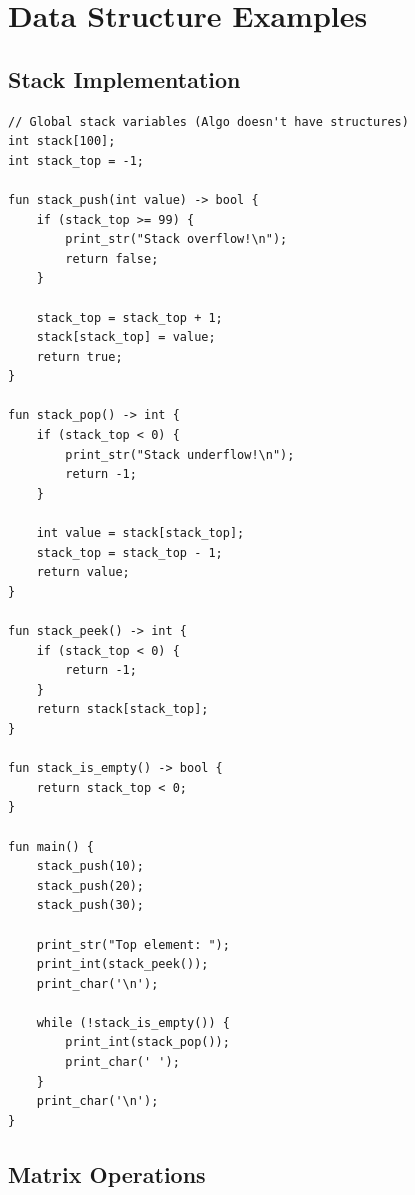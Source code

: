 \documentclass[12pt,a4paper,oneside]{book}
\begin{document}
\section{Data Structure Examples}

\subsection{Stack Implementation}

\begin{lstlisting}[style=algo, caption={Stack Using Arrays}]
// Global stack variables (Algo doesn't have structures)
int stack[100];
int stack_top = -1;

fun stack_push(int value) -> bool {
    if (stack_top >= 99) {
        print_str("Stack overflow!\n");
        return false;
    }
    
    stack_top = stack_top + 1;
    stack[stack_top] = value;
    return true;
}

fun stack_pop() -> int {
    if (stack_top < 0) {
        print_str("Stack underflow!\n");
        return -1;
    }
    
    int value = stack[stack_top];
    stack_top = stack_top - 1;
    return value;
}

fun stack_peek() -> int {
    if (stack_top < 0) {
        return -1;
    }
    return stack[stack_top];
}

fun stack_is_empty() -> bool {
    return stack_top < 0;
}

fun main() {
    stack_push(10);
    stack_push(20);
    stack_push(30);
    
    print_str("Top element: ");
    print_int(stack_peek());
    print_char('\n');
    
    while (!stack_is_empty()) {
        print_int(stack_pop());
        print_char(' ');
    }
    print_char('\n');
}
\end{lstlisting}

\subsection{Matrix Operations}
\end{document}
